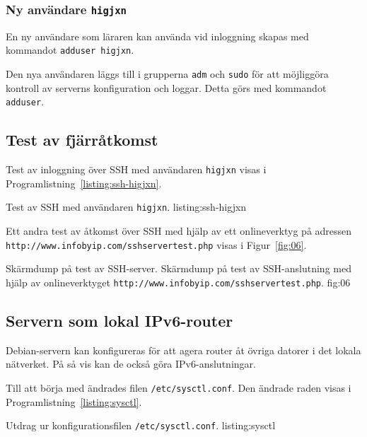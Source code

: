 \subsubsection{Ny användare \texttt{higjxn}}
En ny användare som läraren kan använda vid inloggning skapas med kommandot
\texttt{adduser higjxn}.

Den nya användaren läggs till i grupperna \texttt{adm} och \texttt{sudo} för
att möjliggöra kontroll av serverns konfiguration och loggar. Detta görs med
kommandot \texttt{adduser}.


\subsection{Test av fjärråtkomst}
Test av inloggning över SSH med användaren \texttt{higjxn} visas i
Programlistning~\ref{listing:ssh-higjxn}.

            {Test av SSH med användaren \texttt{higjxn}.}
            {listing:ssh-higjxn}

Ett andra test av åtkomst över SSH med hjälp av ett onlineverktyg på adressen
\texttt{http://www.infobyip.com/sshservertest.php} visas i Figur~\ref{fig:06}.

           {Skärmdump på test av SSH-server.}
					 {Skärmdump på test av SSH-anslutning med hjälp av onlineverktyget 
				    \texttt{http://www.infobyip.com/sshservertest.php}.}
           {fig:06}


\subsection{Servern som lokal IPv6-router}
Debian-servern kan konfigureras för att agera router åt övriga datorer i det
lokala nätverket. På så vis kan de också göra IPv6-anslutningar.

Till att börja med ändrades filen \texttt{/etc/sysctl.conf}. Den ändrade
raden visas i Programlistning~\ref{listing:sysctl}.

             {Utdrag ur konfigurationsfilen \texttt{/etc/sysctl.conf}.}
             {listing:sysctl}
